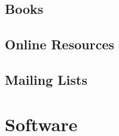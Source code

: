 \documentclass[a4paper,12pt]{report}
\begin{document}
\subsection{Books}



\subsection{Online Resources}



\subsection{Mailing Lists}



\section{Software}


\end{document}
